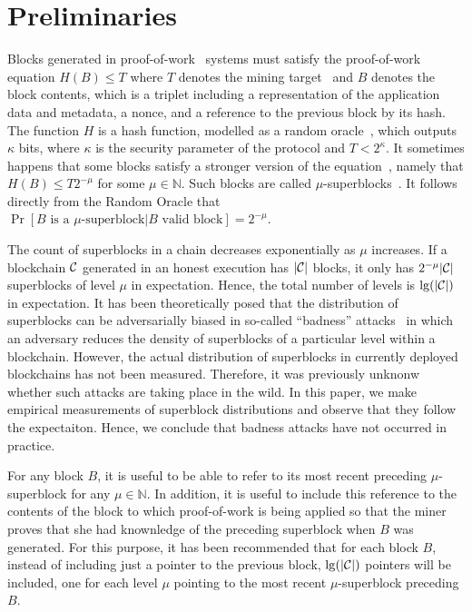 \section{Preliminaries}

Blocks generated in proof-of-work~\cite{C:DwoNao92} systems must satisfy the
proof-of-work equation $H(B) \leq T$ where $T$ denotes the mining
target~\cite{SP:BMCNKF15} and $B$ denotes the block contents, which is a triplet
including a representation of the application data and metadata, a nonce, and a
reference to the previous block by its hash. The function $H$ is a hash
function, modelled as a random oracle~\cite{CCS:BelRog93}, which outputs
$\kappa$ bits, where $\kappa$ is the security parameter of the protocol and $T <
2^\kappa$. It sometimes happens that some blocks satisfy a stronger version of
the equation~\cite{popow}, namely that $H(B) \leq T2^{-\mu}$ for some $\mu \in
\mathbb{N}$. Such blocks are called $\mu$-superblocks~\cite{nipopows}.
It follows directly from the Random Oracle that
$\Pr[B \text{ is a } \mu\text{-superblock}|B \text{ valid block}] = 2^{-\mu}$.


The count of superblocks in a chain decreases exponentially as $\mu$ increases.
If a blockchain $\mathcal{C}$ generated in an honest execution has $|\mathcal{C}|$ blocks,
it only has $2^{-\mu}|\mathcal{C}|$ superblocks of level $\mu$ in expectation. Hence,
the total number of levels is $\lg(|\mathcal{C}|)$ in expectation. It has been
theoretically posed that the distribution of superblocks can be adversarially
biased in so-called ``badness'' attacks~\cite{nipopows} in which an adversary
reduces the density of superblocks of a particular level within a blockchain.
However, the actual distribution of superblocks in currently deployed
blockchains has not been measured. Therefore, it was previously unknonw whether
such attacks are taking place in the wild. In this paper, we make empirical
measurements of superblock distributions and observe that they follow the
expectaiton. Hence, we conclude that badness attacks have not occurred in
practice.

For any block $B$,
it is useful to be able to refer to its most recent preceding $\mu$-superblock
for any $\mu \in \mathbb{N}$. In addition, it is useful to include this
reference to the contents of the block to which proof-of-work is being applied
so that the miner proves that she had knownledge of the preceding superblock
when $B$ was generated. For this purpose, it has been recommended that for each
block $B$, instead of including just a pointer to the previous block,
$\lg(|\mathcal{C}|)$ pointers will be included, one for each level $\mu$ pointing to
the most recent $\mu$-superblock preceding $B$.


